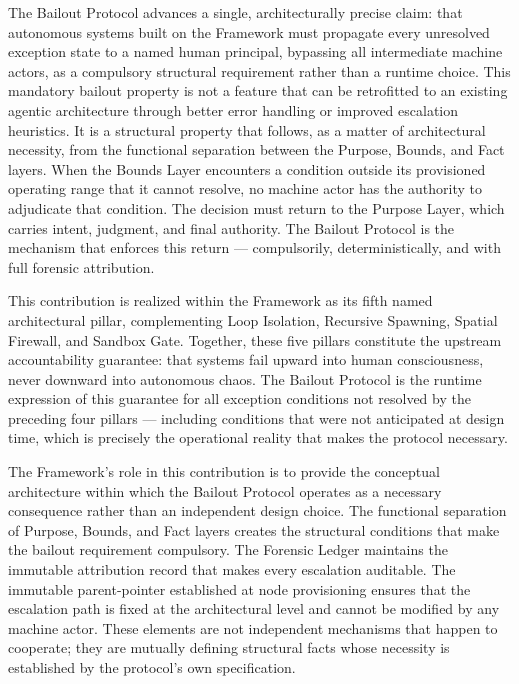 The Bailout Protocol advances a single, architecturally precise claim: that autonomous systems built on the \bxthree{} Framework must propagate every unresolved exception state to a named human principal, bypassing all intermediate machine actors, as a compulsory structural requirement rather than a runtime choice. This mandatory bailout property is not a feature that can be retrofitted to an existing agentic architecture through better error handling or improved escalation heuristics. It is a structural property that follows, as a matter of architectural necessity, from the functional separation between the Purpose, Bounds, and Fact layers. When the Bounds Layer encounters a condition outside its provisioned operating range that it cannot resolve, no machine actor has the authority to adjudicate that condition. The decision must return to the Purpose Layer, which carries intent, judgment, and final authority. The Bailout Protocol is the mechanism that enforces this return --- compulsorily, deterministically, and with full forensic attribution.

This contribution is realized within the \bxthree{} Framework as its fifth named architectural pillar, complementing Loop Isolation, Recursive Spawning, Spatial Firewall, and Sandbox Gate. Together, these five pillars constitute the upstream accountability guarantee: that \bxthree{} systems fail upward into human consciousness, never downward into autonomous chaos. The Bailout Protocol is the runtime expression of this guarantee for all exception conditions not resolved by the preceding four pillars --- including conditions that were not anticipated at design time, which is precisely the operational reality that makes the protocol necessary.

The \bxthree{} Framework's role in this contribution is to provide the conceptual architecture within which the Bailout Protocol operates as a necessary consequence rather than an independent design choice. The functional separation of Purpose, Bounds, and Fact layers creates the structural conditions that make the bailout requirement compulsory. The Forensic Ledger maintains the immutable attribution record that makes every escalation auditable. The immutable parent-pointer established at node provisioning ensures that the escalation path is fixed at the architectural level and cannot be modified by any machine actor. These elements are not independent mechanisms that happen to cooperate; they are mutually defining structural facts whose necessity is established by the protocol's own specification.

